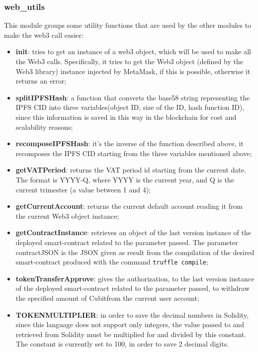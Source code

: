\subsubsection{web\_utils}
This module groups some utility functions that are used by the other modules to make the web3 call easier:
\begin{itemize}
	\item \textbf{init}: tries to get an instance of a web3 object, which will be used to make all the Web3 calls. Specifically, it tries to get the Web3 object (defined by the Web3 library) instance injected by MetaMask\glo, if this is possible, otherwise it returns an error;
	\item \textbf{splitIPFSHash}: a function that converts the base58 string representing the IPFS CID into three variables(object ID, size of the ID, hash function ID), since this information is saved in this way in the blockchain for cost and scalability reasons;
	\item \textbf{recomposeIPFSHash}: it's the inverse of the function described above, it recomposes the IPFS CID starting from the three variables mentioned above;
	\item \textbf{getVATPeriod}: returns the VAT period id starting from the current date. The format is YYYY-Q, where YYYY is the current year, and Q is the current trimester (a value between 1 and 4);
	\item \textbf{getCurrentAccount}: returns the current default account reading it from the current Web3 object instance;
	\item \textbf{getContractInstance}: retrieves an object of the last version instance of the deployed smart-contract related to the parameter passed. The parameter contractJSON is the JSON given as result from the compilation of the desired smart-contract produced with the command \texttt{truffle compile};
	\item \textbf{tokenTransferApprove}: gives the authorization, to the last version instance of the deployed smart-contract related to the parameter passed, to withdraw the specified amount of Cubit\glosp from the current user account;
	\item \textbf{TOKENMULTIPLIER}:     in order to save the decimal numbers in Solidity, since this language does not support only integers, the value passed to and retrieved from Solidity must be multiplied for and divided by this constant. The constant is currently set to 100, in order to save 2 decimal digits.
\end{itemize} 

